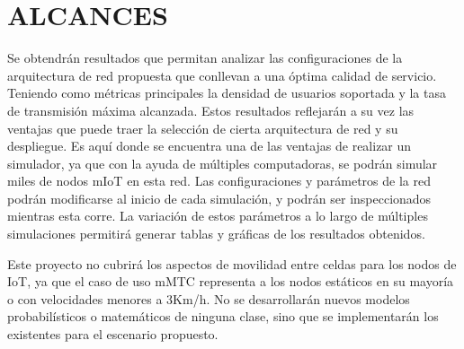 
\section{ALCANCES}

Se obtendrán resultados que permitan analizar las configuraciones de la arquitectura de red propuesta que conllevan a una óptima calidad de servicio. Teniendo como métricas principales la densidad de usuarios soportada y la tasa de transmisión máxima alcanzada. Estos resultados reflejarán a su vez las ventajas que puede traer la selección de cierta arquitectura de red y su despliegue. Es aquí donde se encuentra una de las ventajas de realizar un simulador, ya que con la ayuda de múltiples computadoras, se podrán simular miles de nodos mIoT en esta red. Las configuraciones y parámetros de la red podrán modificarse al inicio de cada simulación, y podrán ser inspeccionados mientras esta corre. La variación de estos parámetros a lo largo de múltiples simulaciones permitirá generar tablas y gráficas de los resultados obtenidos.\newline

Este proyecto no cubrirá los aspectos de movilidad entre celdas para los nodos de IoT, ya que el caso de uso mMTC representa a los nodos estáticos en su mayoría o con velocidades menores a 3Km/h.  No se desarrollarán nuevos modelos probabilísticos o matemáticos de ninguna clase, sino que se implementarán los existentes para el escenario propuesto.\newline
{}